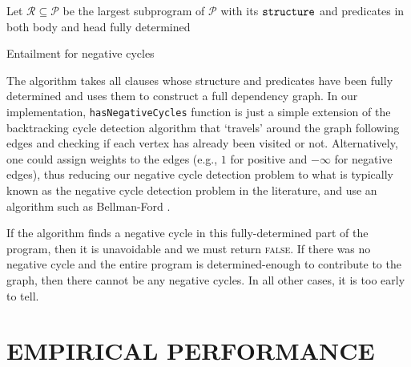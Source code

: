 \documentclass[letterpaper]{article}
\theoremstyle{definition}
\newcommand{\variable}[1]{\texttt{\textup{#1}}}
\begin{document}
\begin{algorithm}
  Let $\mathscr{R} \subseteq \mathscr{P}$ be the largest subprogram of
  $\mathscr{P}$ with its $\variable{structure}$ and predicates in both body
  and head fully determined\footnotemark\;
  \;
  \caption{Entailment for negative cycles}
  \label{alg:negative_cycles}
\end{algorithm}

The algorithm takes all clauses whose structure and predicates have been fully
determined and uses them to construct a full dependency graph. In our
implementation, \texttt{hasNegativeCycles} function is just a simple extension
of the backtracking cycle detection algorithm that `travels' around the graph
following edges and checking if each vertex has already been visited or not.
Alternatively, one could assign weights to the edges (e.g., $1$ for positive
and $-\infty$ for negative edges), thus reducing our negative cycle detection
problem to what is typically known as the negative cycle detection problem in
the literature, and use an algorithm such as Bellman-Ford
\citep{shimbel1954structure}.

If the algorithm finds a negative cycle in this fully-determined part of the
program, then it is unavoidable and we must return \textsc{false}. If there was
no negative cycle and the entire program is determined-enough to contribute to
the graph, then there cannot be any negative cycles. In all other cases, it
is too early to tell.

\section{EMPIRICAL PERFORMANCE}
\end{document}
